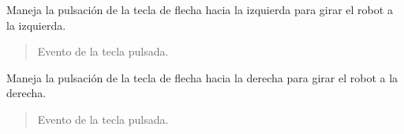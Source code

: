 \documentclass[a4paper,10pt,spanish]{sphinxmanual}
\begin{document}
\begin{fulllineitems}
\begin{fulllineitems}
\end{fulllineitems}


\begin{fulllineitems}
\label{\detokenize{squad_state_manager:squad_interfaz.InterfazManager.on_arrow_left}}
\pysigstartsignatures
{}
\pysigstopsignatures
\sphinxAtStartPar
Maneja la pulsación de la tecla de flecha hacia la izquierda para girar el robot a la izquierda.
\begin{quote}\begin{description}
\sphinxAtStartPar
{} \textendash{} Evento de la tecla pulsada.

\end{description}\end{quote}

\end{fulllineitems}


\begin{fulllineitems}
\label{\detokenize{squad_state_manager:squad_interfaz.InterfazManager.on_arrow_right}}
\pysigstartsignatures
{}
\pysigstopsignatures
\sphinxAtStartPar
Maneja la pulsación de la tecla de flecha hacia la derecha para girar el robot a la derecha.
\begin{quote}\begin{description}
\sphinxAtStartPar
{} \textendash{} Evento de la tecla pulsada.

\end{description}\end{quote}

\end{fulllineitems}



\end{fulllineitems}
\end{document}
